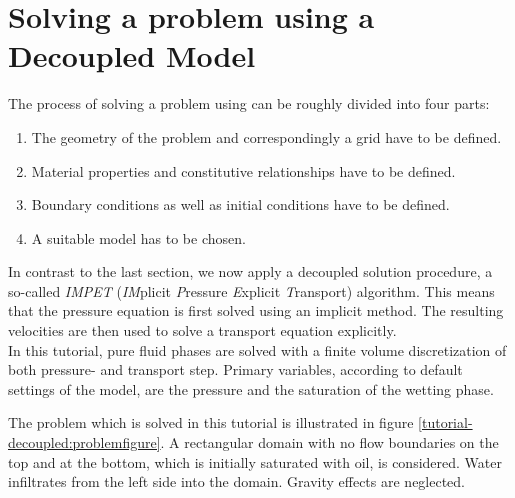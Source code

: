 \section[Decoupled model]{Solving a problem using a Decoupled Model}\label{tutorial-decoupled}
The process of solving a problem using \Dumux can be roughly divided into four parts: 
\begin{enumerate}
 \item The geometry of the problem and correspondingly a grid have to be defined.
 \item Material properties and constitutive relationships have to be defined.
 \item Boundary conditions as well as initial conditions have to be defined.
 \item A suitable model has to be chosen.
\end{enumerate}

In contrast to the last section, we now apply a decoupled solution procedure, a
so-called \textit{IMPET} (\textit{IM}plicit \textit{P}ressure \textit{E}xplicit 
\textit{T}ransport) algorithm. This means that the pressure equation is first 
solved using an implicit method. The resulting velocities are then used to solve
a transport equation explicitly.\\
In this tutorial, pure fluid phases are solved with a finite volume discretization
of both pressure- and transport step. Primary variables, according to default
settings of the model, are the pressure and the saturation of the wetting phase.

The problem which is solved in this tutorial is illustrated in figure 
\ref{tutorial-decoupled:problemfigure}. A rectangular domain with no flow 
boundaries on the top and at the bottom, which is initially saturated with oil, 
is considered. Water infiltrates from the left side into the domain. Gravity 
effects are neglected.

